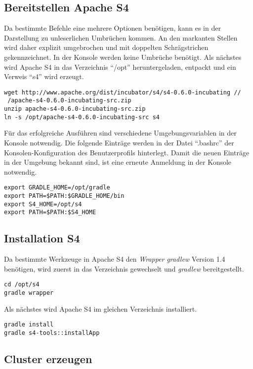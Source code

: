 \subsection{Bereitstellen Apache S4}

Da bestimmte Befehle eine mehrere Optionen benötigen, kann es in der Darstellung zu unleserlichen Umbrüchen kommen. An den markanten Stellen wird daher explizit umgebrochen und mit doppelten Schrägstrichen gekennzeichnet. In der Konsole werden keine Umbrüche benötigt. Als nächstes wird Apache S4 in das Verzeichnis "`/opt"' heruntergeladen, entpackt und ein Verweis "`s4"' wird erzeugt.

\begin{verbatim}
wget http://www.apache.org/dist/incubator/s4/s4-0.6.0-incubating //
 /apache-s4-0.6.0-incubating-src.zip
unzip apache-s4-0.6.0-incubating-src.zip
ln -s /opt/apache-s4-0.6.0-incubating-src s4
\end{verbatim}

Für das erfolgreiche Ausführen sind verschiedene Umgebungsvariablen in der Konsole notwendig. Die folgende Einträge werden in der Datei "`.bashrc"' der Konsolen-Konfiguration des Benutzerprofils hinterlegt. Damit die neuen Einträge in der Umgebung bekannt sind, ist eine erneute Anmeldung in der Konsole notwendig.

\begin{verbatim}
export GRADLE_HOME=/opt/gradle
export PATH=$PATH:$GRADLE_HOME/bin
export S4_HOME=/opt/s4
export PATH=$PATH:$S4_HOME
\end{verbatim}

\subsection{Installation S4}

Da bestimmte Werkzeuge in Apache S4 den \textit{Wrapper} \textit{gradlew} Version 1.4 benötigen, wird zuerst in das Verzeichnis gewechselt und \textit{gradlew} bereitgestellt.

\begin{verbatim}
cd /opt/s4
gradle wrapper
\end{verbatim}

Als nächstes wird Apache S4 im gleichen Verzeichnis installiert.

\begin{verbatim}
gradle install
gradle s4-tools::installApp
\end{verbatim}


\subsection{Cluster erzeugen}


